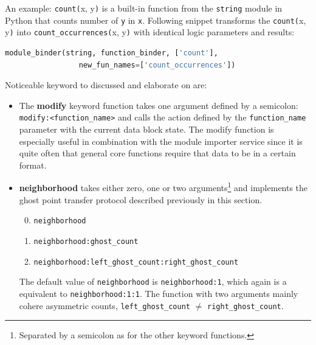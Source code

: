 An example: \texttt{count(}x, y\texttt{)} is a built-in function from the \texttt{string} module in Python that counts number of \texttt{y} in \texttt{x}. Following snippet transforms the \texttt{count(}x, y\texttt{)} into \texttt{count\_occurrences(}x, y\texttt{)} with identical logic parameters and results:
\vspace*{2mm}
\begin{lstlisting}[language=Python, basicstyle=\footnotesize, numbers=none, showtabs=false, showstringspaces=false, showspaces=false, otherkeywords={string,new_fun_names}, stringstyle=\color{blue}]
   module_binder(string, function_binder, ['count'], 
                 new_fun_names=['count_occurrences'])
\end{lstlisting}

Noticeable keyword to discussed and elaborate on are:
\vspace*{2mm}

\begin{itemize}
	\item The \textbf{modify} keyword function takes one argument defined by a semicolon: \texttt{modify:<function\_name>} and calls the action defined by the \texttt{function\_name} parameter with the current data block state. The modify function is especially useful in combination with the module importer service since it is quite often that general core functions require that data to be in a certain format.
	\item \textbf{neighborhood} takes either zero, one or two arguments\footnote{Separated by a semicolon as for the other keyword functions.} and implements the ghost point transfer protocol described previously in this section.
	\begin{enumerate}
		\setcounter{enumi}{-1}
		\item \texttt{neighborhood}
		\item \texttt{neighborhood:ghost\_count}
		\item \texttt{neighborhood:left\_ghost\_count:right\_ghost\_count}
	\end{enumerate}
	The default value of \texttt{neighborhood} is \texttt{neighborhood:1}, which again is a equivalent to \texttt{neighborhood:1:1}. The function with two arguments mainly cohere asymmetric counts, \ie \texttt{left\_ghost\_count} $\neq$ \texttt{right\_ghost\_count}.
\end{itemize}
